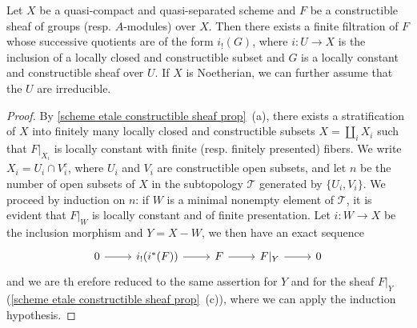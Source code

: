 \begin{proposition}\label{scheme qcqs etale constructible sheaf filtration}
Let $X$ be a quasi-compact and quasi-separated scheme and $F$ be a constructible sheaf of groups (resp. $A$-modules) over $X$. Then there exists a finite filtration of $F$ whose successive quotients are of the form $i_!(G)$, where $i:U\to X$ is the inclusion of a locally closed and constructible subset and $G$ is a locally constant and constructible sheaf over $U$. If $X$ is Noetherian, we can further assume that the $U$ are irreducible.
\end{proposition}
\begin{proof}
By \cref{scheme etale constructible sheaf prop}~(a), there exists a stratification of $X$ into finitely many locally closed and constructible subsets $X=\coprod_iX_i$ such that $F|_{X_i}$ is locally constant with finite (resp. finitely presented) fibers. We write $X_i=U_i\cap V_i^c$, where $U_i$ and $V_i$ are constructible open subsets, and let $n$ be the number of open subsets of $X$ in the subtopology $\mathcal{T}$ generated by $\{U_i,V_i\}$. We proceed by induction on $n$: if $W$ is a minimal nonempty element of $\mathcal{T}$, it is evident that $F|_W$ is locally constant and of finite presentation. Let $i:W\to X$ be the inclusion morphism and $Y=X-W$, we then have an exact sequence
\[\begin{tikzcd}
0\ar[r]&i_!(i^*(F))\ar[r]&F\ar[r]&F|_Y\ar[r]&0
\end{tikzcd}\]
and we are th erefore reduced to the same assertion for $Y$ and for the sheaf $F|_Y$ (\cref{scheme etale constructible sheaf prop}~(c)), where we can apply the induction hypothesis.
\end{proof}


